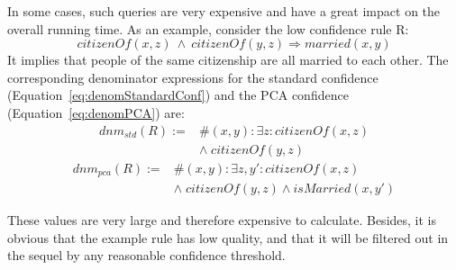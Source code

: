 {\noindent In some cases, such queries are very expensive and have a great impact on the overall running time. As an example,
consider the low confidence rule R: \[citizenOf(x,z)\:\wedge\:citizenOf(y,z) \Rightarrow married(x,y)\]
It implies that people of the same citizenship are all married to each other.
The corresponding denominator expressions for the standard confidence (Equation~\ref{eq:denomStandardConf}) and the PCA confidence (Equation~\ref{eq:denomPCA}) are:
\begin{equation*}
\begin{array}{rl}
dnm_{std}(R) := & \#(x,y): \exists z: citizenOf(x,z)\\ & \wedge\; citizenOf(y,z)
\end{array}
\label{eq:denomStandardCofn}
\end{equation*}
\begin{equation*}
\begin{array}{rl}
dnm_{pca}(R) := &\#(x,y): \exists z, y': citizenOf(x,z)  \\
  &\wedge\; citizenOf(y,z) \wedge isMarried(x,y') \label{eq:denomPCA}
\end{array}
\end{equation*}

These values are very large and therefore expensive to calculate. Besides, it is obvious that the example rule has low quality, and
that it will be filtered out in the sequel by any reasonable confidence threshold.

}
